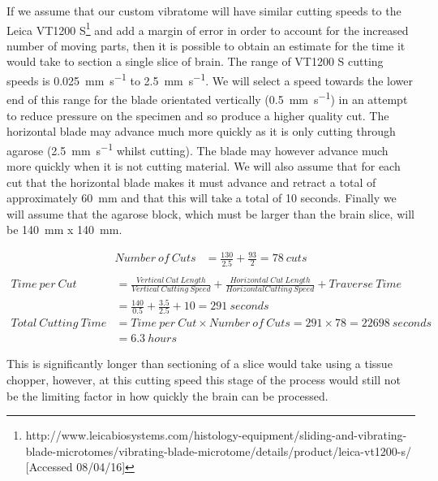 \documentclass[a4paper, 11pt]{article}
\numberwithin{equation}{section}
\begin{document}
	If we assume that our custom vibratome will have similar cutting speeds to the Leica VT1200 S\footnote{http://www.leicabiosystems.com/histology-equipment/sliding-and-vibrating-blade-microtomes/vibrating-blade-microtome/details/product/leica-vt1200-s/ [Accessed 08/04/16]} and add a margin of error in order to account for the increased number of moving parts, then it is possible to obtain an estimate for the time it would take to section a single slice of brain. The range of VT1200 S cutting speeds is \SI{0.025}{\milli\meter\per\second} to \SI{2.5}{\milli\meter\per\second}. We will select a speed towards the lower end of this range for the blade orientated vertically (\SI{0.5}{\milli\meter\per\second}) in an attempt to reduce pressure on the specimen and so produce a higher quality cut. The horizontal blade may advance much more quickly as it is only cutting through agarose (\SI{2.5}{\milli\meter\per\second} whilst cutting). The blade may however advance much more quickly when it is not cutting material. We will also assume that for each cut that the horizontal blade makes it must advance and retract a total of approximately \SI{60}{\milli\meter} and that this will take a total of 10 seconds. Finally we will assume that the agarose block, which must be larger than the brain slice, will be \SI{140}{\milli\meter} x \SI{140}{\milli\meter}.
	
	\begin{align*}
	Number\ of\ Cuts &= \frac{130}{2.5} + \frac{93}{2} = 78\ cuts \nonumber \\			
	\end{align*}
	\begin{align}
	Time\ per\ Cut &= \frac{Vertical\ Cut\ Length}{Vertical\ Cutting\ Speed} +\frac{Horizontal\ Cut\ Length}{Horizontal Cutting\ Speed} + Traverse\ Time \nonumber \\
	&= \frac{140}{0.5} + \frac{3.5}{2.5} + 10 = 291\ seconds \nonumber \\
	Total\ Cutting\ Time &= Time\ per\ Cut \times Number\ of\ Cuts = 291 \times 78 = 22698\ seconds	\nonumber \\
	&= 6.3\ hours
	\end{align}
	
	This is significantly longer than sectioning of a slice would take using a tissue chopper, however, at this cutting speed this stage of the process would still not be the limiting factor in how quickly the brain can be processed. 
	
\end{document}
